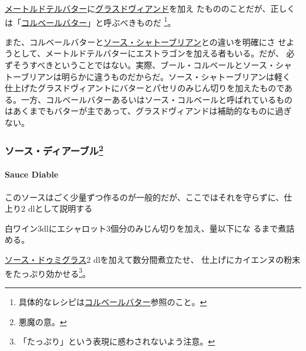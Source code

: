 \begin{recette}
\protect\hyperlink{}{メートルドテルバター}に\protect\hyperlink{glace-de-viande}{グラスドヴィアンド}を加え
たもののことだが、正しくは「\protect\hyperlink{}{コルベールバター}」と呼ぶべきものだ
\footnote{具体的なレシピは\protect\hyperlink{}{コルベールバター}参照のこと。}。

また、コルベールバターと\protect\hyperlink{sauce-chateaubriand}{ソース・シャトーブリアン}との違いを明確にさ
せようとして、メートルドテルバターにエストラゴンを加える者もいる。だが、
必ずそうすべきということではない。実際、ブール・コルベールとソース・シャ
トーブリアンは明らかに違うものだからだ。ソース・シャトーブリアンは軽く
仕上げたグラスドヴィアントにバターとパセリのみじん切りを加えたものであ
る。一方、コルベールバターあるいはソース・コルベールと呼ばれているもの
はあくまでもバターが主であって、グラスドヴィアンドは補助的なものに過ぎ
ない。

\maeaki

\hypertarget{ux30bdux30fcux30b9ux30c7ux30a3ux30a2ux30fcux30d6ux30eb25}{%
\subsubsection[ソース・ディアーブル]{\texorpdfstring{ソース・ディアーブル\footnote{悪魔の意。}}{ソース・ディアーブル}}\label{ux30bdux30fcux30b9ux30c7ux30a3ux30a2ux30fcux30d6ux30eb25}}

\hypertarget{sauce-diable}{%
\paragraph{Sauce Diable}\label{sauce-diable}}


このソースはごく少量ずつ作るのが一般的だが、ここではそれを守らずに、仕
上り2\undemi{} dlとして説明する

白ワイン3dlにエシャロット3個分のみじん切りを加え、\untiers{}量以下にな
るまで煮詰める。

\protect\hyperlink{sauce-demi-glace}{ソース・ドゥミグラス}2
dlを加えて数分間煮立たせ、
仕上げにカイエンヌの粉末をたっぷり効かせる\footnote{「たっぷり」という表現に惑わされないよう注意。}。


\end{recette}
